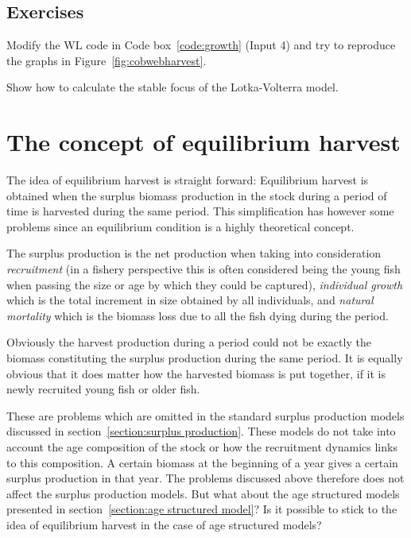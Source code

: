 \documentclass[11pt,fleqn]{book} %
\begin{document}
\section*{Exercises}
\begin{exercise}
Modify the WL code in Code box~\ref{code:growth} (Input 4) and  try to reproduce the graphs in Figure~\ref{fig:cobwebharvest}.
\end{exercise}
\begin{exercise}
Show how to calculate the stable focus of the Lotka-Volterra model.
\end{exercise}


\chapter{The concept of equilibrium harvest} \label{chapter 5}
The idea of equilibrium harvest is straight forward: Equilibrium harvest is obtained when the surplus biomass production in the stock during a period of time is harvested during the same period. This simplification has however some problems since an equilibrium condition is a highly theoretical concept.

The surplus production is the net production when taking into consideration \textit{recruitment} (in a fishery perspective this is often considered being the young fish when passing the size or age by which they could be captured), \textit{individual growth} which is the total increment in size obtained by all individuals, and \textit{natural mortality} which is the biomass loss due to all the fish dying during the period.

Obviously the harvest production during a period could not be exactly the biomass constituting the surplus production during the same period. It is equally obvious that it does matter how the harvested biomass is put together, if it is newly recruited young fish or older fish.

These are problems which are omitted in the standard surplus production models discussed in section~\ref{section:surplus production}. These models do not take into account the age composition of the stock or how the recruitment dynamics links to this composition. A certain biomass at the beginning of a year gives a certain surplus production in that year. The problems discussed above therefore does not affect the surplus production models. But what about the age structured models presented in section~\ref{section:age structured model}? Is it possible to stick to the idea of equilibrium harvest in the case of age structured models?
\end{document}
